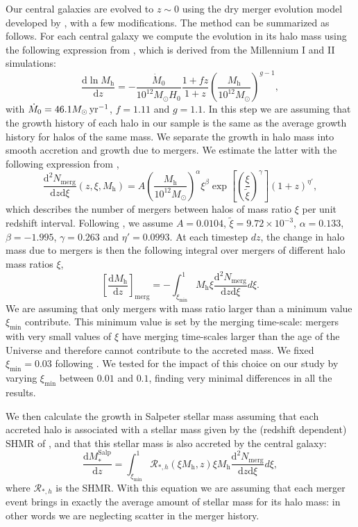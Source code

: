 \documentclass[usenatbib, letters]{mnras}
\def\mhalo{M_{\mathrm{h}}}
\def\ximin{\xi_{\mathrm{min}}}
\def\msalp{M_*^{\mathrm{Salp}}}
\begin{document}
Our central galaxies are evolved to $z\sim0$ using the dry merger evolution model developed by \citet{Nip++12}, with a few modifications.
The method can be summarized as follows.
For each central galaxy we compute the evolution in its halo mass  using the following expression from \citet{FMB10}, which is derived from the Millennium I and II simulations:
\begin{equation}
\frac{\mathrm{d}\ln{\mhalo}}{\mathrm{d}z} = - \frac{\dot{M}_0}{10^{12}M_\odot H_0}\frac{1 + fz}{1 + z}\left(\frac{\mhalo}{10^{12}M_\odot}\right)^{g-1},
\end{equation}
with $\dot{M}_0 = 46.1 M_\odot \rm{\, yr}^{-1}$, $f=1.11$ and $g=1.1$.
In this step we are assuming that the growth history of each halo in our sample is the same as the average growth history for halos of the same mass.
We separate the growth in halo mass into smooth accretion and growth due to mergers. We estimate the latter with the following expression from \citet{FMB10},
\begin{equation}\label{eq:nmerg}
\frac{\mathrm{d}^2N_{\mathrm{merg}}}{\mathrm{d}z \mathrm{d}\xi}(z, \xi, \mhalo) = A\left(\frac{\mhalo}{10^{12}M_\odot}\right)^\alpha \xi ^\beta \exp{\left[\left(\frac{\xi}{\tilde{\xi}}\right)^\gamma\right]}(1 + z)^{\eta'},
\end{equation}
which describes the number of mergers between halos of mass ratio $\xi$ per unit redshift interval.
Following \citet{FMB10}, we assume $A=0.0104$, $\tilde{\xi}=9.72\times10^{-3}$, $\alpha=0.133$, $\beta=-1.995$, $\gamma=0.263$ and $\eta'=0.0993$.
At each timestep $dz$, the change in halo mass due to mergers is then the following integral over mergers of different halo mass ratios $\xi$,
\begin{equation}
\left[\frac{\mathrm{d}\mhalo}{\mathrm{d}z}\right]_{\mathrm{merg}} = -\int_{\ximin}^1 \mhalo\xi \frac{\mathrm{d}^2N_{\mathrm{merg}}}{\mathrm{d}z \mathrm{d}\xi} d\xi.
\end{equation}
We are assuming that only mergers with mass ratio larger than a minimum value $\ximin$ contribute. This minimum value is set by the merging time-scale: mergers with very small values of $\xi$ have merging time-scales larger than the age of the Universe and therefore cannot contribute to the accreted mass. We fixed $\ximin=0.03$ following \citet{Nip++12}. We tested for the impact of this choice on our study by varying $\ximin$ between $0.01$ and $0.1$, finding very minimal differences in all the results.

We then calculate the growth in Salpeter stellar mass assuming that each accreted halo is associated with a stellar mass given by the (redshift dependent) SHMR of \citet{Lea++12}, and that this stellar mass is also accreted by the central galaxy:
\begin{equation}
\frac{\mathrm{d}\msalp}{\mathrm{d}z} = \int_{\ximin}^1 \mathcal{R}_{*,h}(\xi \mhalo, z)\xi\mhalo\frac{\mathrm{d}^2N_{\mathrm{merg}}}{\mathrm{d}z \mathrm{d}\xi} d\xi,
\end{equation}
where $\mathcal{R}_{*,h}$ is the SHMR. With this equation we are assuming that each merger event brings in exactly the average amount of stellar mass for its halo mass: in other words we are neglecting scatter in the merger history.
\end{document}
